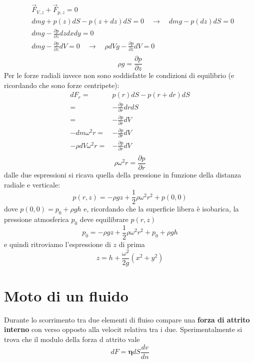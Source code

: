 \documentclass[x11names]{report}
\begin{document}
	\begin{align*}
		&\overrightarrow{F}_{V,z} + \overrightarrow{F}_{p,z} = 0 \\
		& dm g + p(z)dS - p(z+dz)dS = 0 \quad  \to \quad dmg - p(dz)dS = 0\\
		& dmg - \frac{\partial p}{\partial z}dzdxdy = 0 \\
		& dmg - \frac{\partial p}{\partial z}dV = 0  \quad \to \quad \rho dV g -  \frac{\partial p}{\partial z}dV = 0 \\
	\end{align*}
	\[ 
	\boxed{\rho g = \frac{\partial p}{\partial z}}
	\]
	Per le forze radiali invece non sono soddisfatte le condizioni di equilibrio (e ricordando che sono forze centripete):
	\begin{align*}
		dF_{r} =& p(r)dS - p(r+dr)dS \\
		=& - \frac{\partial p}{\partial r}drdS \\
		=& - \frac{\partial p}{\partial r}dV \\
		-dm \omega^2 r =& - \frac{\partial p}{\partial r}dV \\
		-\rho dV \omega^2 r =& - \frac{\partial p}{\partial r}dV \\
	\end{align*}
	\[ 
	\boxed{\rho \omega^2 r =  \frac{\partial p}{\partial r}}
	\]
	dalle due espressioni si ricava quella della pressione in funzione della distanza radiale e verticale:
	\begin{equation}
		p(r,z) = -\rho gz + \frac{1}{2}\rho \omega ^2 r^2 + p(0,0)
	\end{equation}
	dove \(p(0,0) = p_{0} + \rho gh\) e, ricordando che la superficie libera è isobarica, la pressione atmosferica \(p_{0}\) deve equilibrare \(p(r,z)\)
	\[ 
	p_{0} =  -\rho gz + \frac{1}{2}\rho \omega ^2 r^2 + p_{0} + \rho gh
	\]
	e quindi ritroviamo l'espressione di \(z\) di prima
	\[ 
	z = h +\frac{\omega ^2}{2g}(x^2 +y^2)
	\]
	
	\section{Moto  di un fluido}
	Durante lo scorrimento tra due elementi di fluiso compare una \textbf{forza di attrito interno} con verso opposto alla velocit relativa tra i due. Sperimentalmente si trova che il modulo della forza d attrito vale 
	\begin{equation}
		dF = \boldsymbol{\eta} dS \frac{dv}{dn}
	\end{equation}
	
\end{document}
